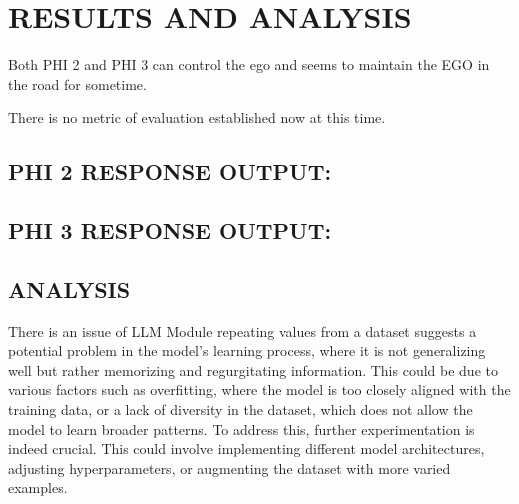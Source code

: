 
\chapter{\uppercase{Results and Analysis}} %
\label{chap5} %
\begin{spacing}{1.5} 
\begin{sloppypar}

Both PHI 2 and PHI 3 can control the ego and seems to maintain the EGO in the road for sometime. 

There is no metric of evaluation established now at this time. 

\section{PHI 2 RESPONSE OUTPUT:}


\section{PHI 3 RESPONSE OUTPUT:}


\section{ANALYSIS}
There is an issue of LLM Module repeating values from a dataset suggests a potential problem in the model's learning process, where it is not generalizing well but rather memorizing and regurgitating information. This could be due to various factors such as overfitting, where the model is too closely aligned with the training data, or a lack of diversity in the dataset, which does not allow the model to learn broader patterns. To address this, further experimentation is indeed crucial. This could involve implementing different model architectures, adjusting hyperparameters, or augmenting the dataset with more varied examples. 


\end{sloppypar}
\end{spacing}
